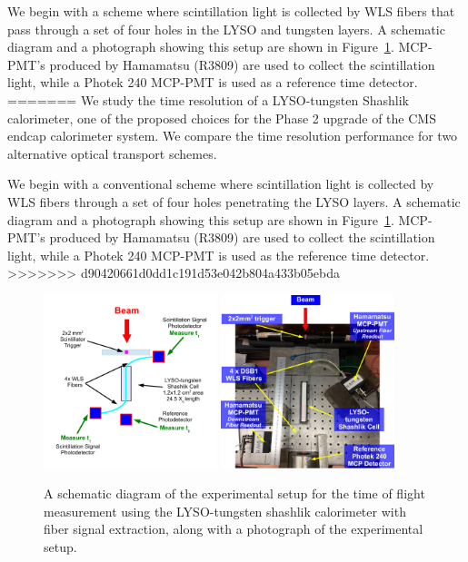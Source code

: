 \documentclass[12pt]{article}
\begin{document}
We begin with a scheme where scintillation light is collected
by WLS fibers that pass through a set of four holes in
the LYSO and tungsten layers. A schematic diagram and a photograph showing this setup 
are shown in Figure~\ref{fig:ShashlikFiberSetup}. 
MCP-PMT's produced by Hamamatsu (R3809) are used to collect 
the scintillation light, while a Photek 240 MCP-PMT is used as a reference 
time detector. 
=======
We study the time resolution of a LYSO-tungsten Shashlik calorimeter, one of the
proposed choices for the Phase 2 upgrade of the CMS endcap calorimeter system.
We compare the time resolution performance for two alternative optical transport
schemes. 

We begin with a conventional scheme where scintillation light is collected by
WLS fibers through a set of four holes penetrating the LYSO layers. A schematic
diagram and a photograph showing this setup are shown in
Figure~\ref{fig:ShashlikFiberSetup}. MCP-PMT's produced by Hamamatsu (R3809) are
used to collect the scintillation light, while a Photek 240 MCP-PMT is used as
the reference time detector. 
>>>>>>> d90420661d0dd1c191d53e042b804a433b05ebda


\begin{figure}[H] \centering
\includegraphics[width=0.45\textwidth]{figs/ShashlikFiberSetupSchematic} 
\includegraphics[width=0.45\textwidth]{figs/ShashlikFiberSetupPhoto} 
\caption{ A schematic diagram of the experimental setup for the
time of flight measurement using the LYSO-tungsten shashlik calorimeter
with fiber signal extraction, along with a photograph of the
experimental setup. } 
\label{fig:ShashlikFiberSetup}
\end{figure}
\end{document}
